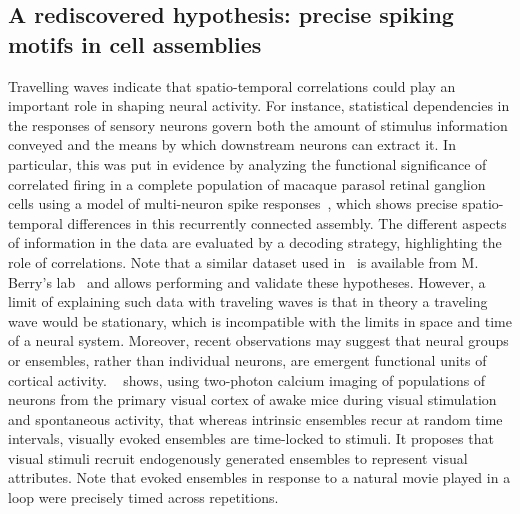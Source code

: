 \documentclass[brainsci, %
               review,submit,pdftex,moreauthors
               ]{Definitions/mdpi}
\begin{document}
\subsection{A rediscovered hypothesis: precise spiking motifs in cell assemblies}
Travelling waves indicate that spatio-temporal correlations could play an important role in shaping neural activity. For instance, statistical dependencies in the responses of sensory neurons govern both the amount of stimulus information conveyed and the means by which downstream neurons can extract it. In particular, this was put in evidence by analyzing the functional significance of correlated firing in a complete population of macaque parasol retinal ganglion cells using a model of multi-neuron spike responses~\citep{pillow_spatio-temporal_2008}, which shows precise spatio-temporal differences in this recurrently connected assembly. The different aspects of information in the data are evaluated by a decoding strategy, highlighting the role of correlations. Note that a similar dataset used in~\citep{schneidman_weak_2006} is available from M. Berry's lab~\citep{berry_spike_2022} and allows performing and validate these hypotheses. However, a limit of explaining such data with traveling waves is that in theory a traveling wave would be stationary, which is incompatible with the limits in space and time of a neural system. Moreover, recent observations may suggest that neural groups or ensembles, rather than individual neurons, are emergent functional units of cortical activity. ~\citep{miller_visual_2014} shows, using two-photon calcium imaging of populations of neurons from the primary visual cortex of awake mice during visual stimulation and spontaneous activity, that whereas intrinsic ensembles recur at random time intervals, visually evoked ensembles are time-locked to stimuli. It proposes that visual stimuli recruit endogenously generated ensembles to represent visual attributes. Note that evoked ensembles in response to a natural movie played in a loop were precisely timed across repetitions. %
\end{document}
